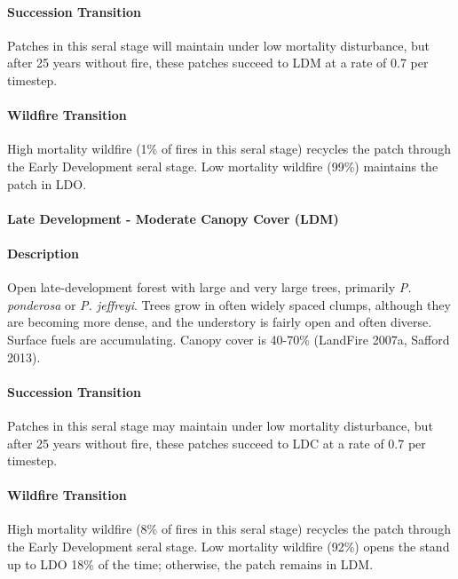 \paragraph*{Succession Transition} Patches in this seral stage will maintain under low mortality disturbance, but after 25 years without fire, these patches succeed to LDM at a rate of 0.7 per timestep.

\paragraph*{Wildfire Transition} High mortality wildfire (1\% of fires in this seral stage) recycles the patch through the Early Development seral stage. Low mortality wildfire (99\%) maintains the patch in LDO.

\noindent\hrulefill

\paragraph*{Late Development - Moderate Canopy Cover (LDM)}

\paragraph*{Description} Open late-development forest with large and very large trees, primarily \emph{P. ponderosa} or \emph{P. jeffreyi}. Trees grow in often widely spaced clumps, although they are becoming more dense, and the understory is fairly open and often diverse. Surface fuels are accumulating. Canopy cover is 40-70\% (LandFire 2007a, Safford 2013).

\paragraph*{Succession Transition} Patches in this seral stage may maintain under low mortality disturbance, but after 25 years without fire, these patches succeed to LDC at a rate of 0.7 per timestep.

\paragraph*{Wildfire Transition} High mortality wildfire (8\% of fires in this seral stage) recycles the patch through the Early Development seral stage. Low mortality wildfire (92\%) opens the stand up to LDO 18\% of the time; otherwise, the patch remains in LDM.

\noindent\hrulefill

